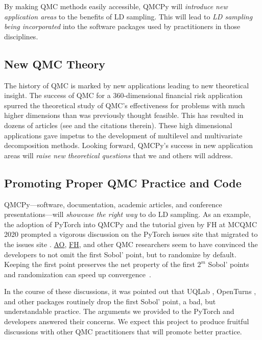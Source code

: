 \documentclass[11pt]{NSFamsart}
\newcommand{\FH}{\hyperlink{FHlink}{FH}\xspace}
\newcommand{\AO}{\hyperlink{AOlink}{AO}\xspace}
\begin{document}
By making QMC methods easily accessible, QMCPy will \emph{introduce new application areas} to the benefits of LD sampling.  This will lead to \emph{LD sampling being incorporated} into the software packages used by practitioners in those disciplines.

\subsection{New QMC Theory}
The history of QMC is marked by new applications leading to new theoretical insight.  The success of QMC for a $360$-dimensional financial risk application \cite{PasTra95} spurred the theoretical study of QMC's effectiveness for problems with much higher dimensions than was previously thought feasible.  This has resulted in dozens of articles (see \cite{NovWoz10a,DicEtal14a} and the citations therein).  These high dimensional applications gave impetus to the development of multilevel \cite{Gil15a} and multivariate decomposition \cite{KuoEtal17a} methods. Looking forward, QMCPy's success in new application areas will \emph{raise new theoretical questions} that we and others will address.

\subsection{Promoting Proper QMC Practice and Code}
QMCPy---software, documentation, academic articles, and conference presentations---will \emph{showcase the right way} to do LD sampling.  As an example, the adoption of PyTorch into QMCPy and the tutorial given by FH at MCQMC 2020 \cite{MCQMC2020QMCPyTut} prompted a vigorous discussion on the PyTorch issues site \cite{PyTorchFirstPt2020a} that migrated to the  issues site \cite{scipySobol2020a}.  \AO, \FH, and other QMC researchers seem to have convinced the developers to not omit the first Sobol' point, but to randomize by default.  Keeping the first point preserves the net property of the first $2^m$ Sobol' points and randomization can speed up convergence~\cite{owen2020dropping}.

In the course of these discussions, it was pointed out that UQLab \cite{UQLab}, OpenTurns \cite{OpenTURNS}, and other packages routinely drop the first Sobol' point, a bad, but understandable practice.  The arguments we provided to the PyTorch and  developers answered their concerns.  We expect this project to produce fruitful discussions with other QMC practitioners that will promote better practice.
\end{document}
